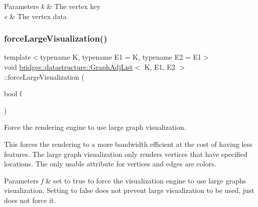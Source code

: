 \begin{DoxyParams}{Parameters}
{\em k} & The vertex key \\
\hline
{\em e} & The vertex data \\
\hline
\end{DoxyParams}
\mbox{\label{classbridges_1_1datastructure_1_1_graph_adj_list_a6860a0a153fd126ebe8b1bc40d2753a7}} 
\subsubsection{\texorpdfstring{force\+Large\+Visualization()}{forceLargeVisualization()}}
{\footnotesize\ttfamily template$<$typename K, typename E1 = K, typename E2 = E1$>$ \\
void \hyperlink{classbridges_1_1datastructure_1_1_graph_adj_list}{bridges\+::datastructure\+::\+Graph\+Adj\+List}$<$ K, E1, E2 $>$\+::force\+Large\+Visualization (\begin{DoxyParamCaption}\item[{bool}]{f }\end{DoxyParamCaption})\hspace{0.3cm}{\ttfamily [inline]}}



Force the rendering engine to use large graph visualization. 

This forces the rendering to a more bandwidth efficient at the cost of having less features. The large graph visualization only renders vertices that have specified locations. The only usable attribute for vertices and edges are colors.


\begin{DoxyParams}{Parameters}
{\em f} & set to true to force the visualization engine to use large graphs visualization. Setting to false does not prevent large visualization to be used, just does not force it. \\
\hline
\end{DoxyParams}
\mbox{\label{classbridges_1_1datastructure_1_1_graph_adj_list_a9706e3df7d30320b7e7773a6423e4ff7}} 
